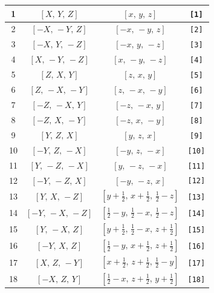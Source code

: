 \documentclass[fleqn,8pt]{jsarticle}
\begin{document}
\begin{longtable}{cccc}
1 & $\left[ X,\, Y,\, Z \right]$ & $\left[ x,\, y,\, z \right]$ & {\tt [1]} \\ \hline
2 & $\left[ - X,\, - Y,\, Z \right]$ & $\left[ - x,\, - y,\, z \right]$ & {\tt [2]} \\ \hline
3 & $\left[ - X,\, Y,\, - Z \right]$ & $\left[ - x,\, y,\, - z \right]$ & {\tt [3]} \\ \hline
4 & $\left[ X,\, - Y,\, - Z \right]$ & $\left[ x,\, - y,\, - z \right]$ & {\tt [4]} \\ \hline
5 & $\left[ Z,\, X,\, Y \right]$ & $\left[ z,\, x,\, y \right]$ & {\tt [5]} \\ \hline
6 & $\left[ Z,\, - X,\, - Y \right]$ & $\left[ z,\, - x,\, - y \right]$ & {\tt [6]} \\ \hline
7 & $\left[ - Z,\, - X,\, Y \right]$ & $\left[ - z,\, - x,\, y \right]$ & {\tt [7]} \\ \hline
8 & $\left[ - Z,\, X,\, - Y \right]$ & $\left[ - z,\, x,\, - y \right]$ & {\tt [8]} \\ \hline
9 & $\left[ Y,\, Z,\, X \right]$ & $\left[ y,\, z,\, x \right]$ & {\tt [9]} \\ \hline
10 & $\left[ - Y,\, Z,\, - X \right]$ & $\left[ - y,\, z,\, - x \right]$ & {\tt [10]} \\ \hline
11 & $\left[ Y,\, - Z,\, - X \right]$ & $\left[ y,\, - z,\, - x \right]$ & {\tt [11]} \\ \hline
12 & $\left[ - Y,\, - Z,\, X \right]$ & $\left[ - y,\, - z,\, x \right]$ & {\tt [12]} \\ \hline
13 & $\left[ Y,\, X,\, - Z \right]$ & $\left[ y + \frac{1}{2},\, x + \frac{1}{2},\, \frac{1}{2} - z \right]$ & {\tt [13]} \\ \hline
14 & $\left[ - Y,\, - X,\, - Z \right]$ & $\left[ \frac{1}{2} - y,\, \frac{1}{2} - x,\, \frac{1}{2} - z \right]$ & {\tt [14]} \\ \hline
15 & $\left[ Y,\, - X,\, Z \right]$ & $\left[ y + \frac{1}{2},\, \frac{1}{2} - x,\, z + \frac{1}{2} \right]$ & {\tt [15]} \\ \hline
16 & $\left[ - Y,\, X,\, Z \right]$ & $\left[ \frac{1}{2} - y,\, x + \frac{1}{2},\, z + \frac{1}{2} \right]$ & {\tt [16]} \\ \hline
17 & $\left[ X,\, Z,\, - Y \right]$ & $\left[ x + \frac{1}{2},\, z + \frac{1}{2},\, \frac{1}{2} - y \right]$ & {\tt [17]} \\ \hline
18 & $\left[ - X,\, Z,\, Y \right]$ & $\left[ \frac{1}{2} - x,\, z + \frac{1}{2},\, y + \frac{1}{2} \right]$ & {\tt [18]} \\ \hline

\end{longtable}
\end{document}
